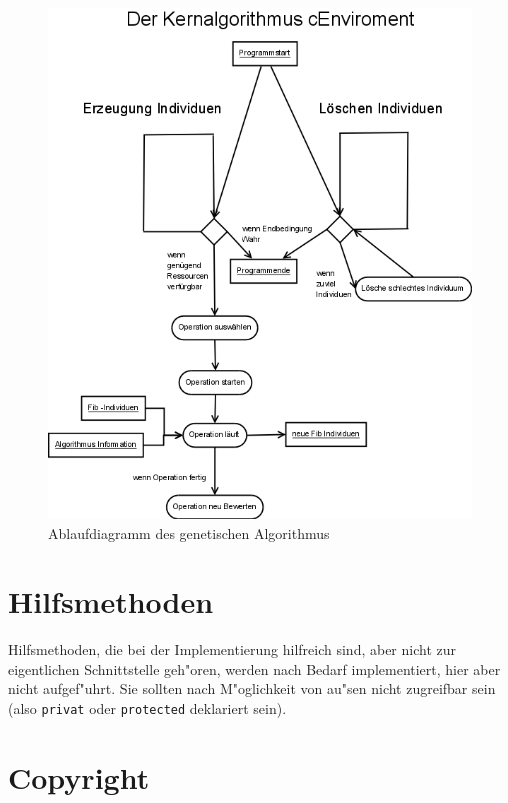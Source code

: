 \begin{figure}[htbp]
\begin{center}
  \includegraphics[scale=0.4]{programmablauf}
\end{center}
\caption{Ablaufdiagramm des genetischen Algorithmus}
\label{figEnviromentAlgorithmus}
\end{figure}


\section{Hilfsmethoden}

Hilfsmethoden, die bei der Implementierung hilfreich sind, aber nicht zur eigentlichen Schnittstelle geh"oren, werden nach Bedarf implementiert, hier aber nicht aufgef"uhrt. Sie sollten nach M"oglichkeit von au"sen nicht zugreifbar sein (also \verb|privat| oder \verb|protected| deklariert sein).


\section{Copyright}

